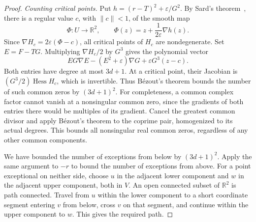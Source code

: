 \documentclass[11pt,letterpaper]{article}
\newcommand{\R}{\mathbb R}
\newcommand{\norm}[1]{\lVert#1\rVert}
\DeclareMathOperator{\Hess}{Hess}
\begin{document}
\begin{proof}
\emph{Counting critical points.} Put $h=(r-T)^2+\varepsilon/G^2$. By Sard's theorem~\cite{sard}, there is a regular value $c$, with $\norm c<1$, of the smooth map
\[
\Phi:U\longrightarrow\R^2,\qquad
\Phi(z)=z+\frac1{2\varepsilon}\nabla h(z).
\]
Since $\nabla H_c=2\varepsilon(\Phi-c)$, all critical points of $H_c$ are nondegenerate. Set $E=F-TG$. Multiplying $\nabla H_c/2$ by $G^3$ gives the polynomial vector
\begin{equation}\label{eq:critical}
EG\nabla E-(E^2+\varepsilon)\nabla G+\varepsilon G^3(z-c).
\end{equation}
Both entries have degree at most $3d+1$. At a critical point, their Jacobian is $(G^3/2)\Hess H_c$, which is invertible. Thus B\'ezout's theorem bounds the number of such common zeros by $(3d+1)^2$. For completeness, a common complex factor cannot vanish at a nonsingular common zero, since the gradients of both entries there would be multiples of its gradient. Cancel the greatest common divisor and apply B\'ezout's theorem to the coprime pair, homogenized to its actual degrees. This bounds all nonsingular real common zeros, regardless of any other common components.

We have bounded the number of exceptions from below by $(3d+1)^2$. Apply the same argument to $-r$ to bound the number of exceptions from above. For a point exceptional on neither side, choose $u$ in the adjacent lower component and $w$ in the adjacent upper component, both in $V$. An open connected subset of $\R^2$ is path connected. Travel from $u$ within the lower component to a short coordinate segment entering $v$ from below, cross $v$ on that segment, and continue within the upper component to $w$. This gives the required path.
\end{proof}
\end{document}
